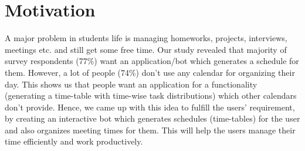 \documentclass{sig-alternate-05-2015}
\begin{document}
\section{Motivation}
A major problem in students life is managing homeworks, projects, interviews, meetings etc. and still get some free time. Our study revealed that majority of survey respondents (77\%) want an application/bot which generates a schedule for them. However, a lot of people (74\%) don't use any calendar for organizing their day. This shows us that people want an application for a functionality (generating a time-table with time-wise task distributions) which other calendars don't provide. Hence, we came up with this idea to fulfill the users' requirement, by creating an interactive bot which generates schedules (time-tables) for the user and also organizes meeting times for them. This will help the users manage their time efficiently and work productively.
\end{document}
